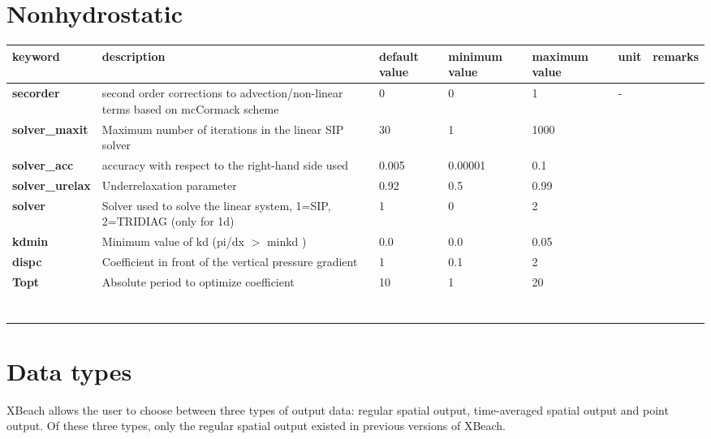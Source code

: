 \section{Nonhydrostatic}

\begin{tabular}{|p{0.7in}|p{0.9in}|p{0.4in}|p{0.5in}|p{0.5in}|p{0.3in}|p{0.5in}|} \hline 
keyword\textbf{} & description & default value & minimum value & maximum value & unit & remarks \\ \hline 
\textbf{secorder} & second order corrections to advection/non-linear terms based on mcCormack scheme & 0 & 0 & 1 & - &  \\ \hline 
\textbf{solver\_maxit} & Maximum number of iterations in the linear SIP solver & 30 & 1 & 1000 &  &  \\ \hline 
\textbf{solver\_acc} & accuracy with respect to the right-hand side used & 0.005 & 0.00001 & 0.1 &  &  \\ \hline 
\textbf{solver\_urelax} & Underrelaxation parameter & 0.92 & 0.5 & 0.99 &  &  \\ \hline 
\textbf{solver} & Solver used to solve the linear system, 1=SIP, 2=TRIDIAG (only for 1d) & 1 & 0 & 2 &  &  \\ \hline 
\textbf{kdmin} & Minimum value of kd (pi/dx $>$ minkd ) & 0.0 & 0.0 & 0.05 &  &  \\ \hline 
\textbf{dispc} & Coefficient in front of the vertical pressure gradient & 1 & 0.1 & 2 &  &  \\ \hline 
\textbf{Topt} & Absolute period to optimize coefficient & 10 & 1 & 20 &  &  \\ \hline 
\textbf{} &  &  &  &  &  &  \\ \hline 
\textbf{} &  &  &  &  &  &  \\ \hline 
\textbf{} &  &  &  &  &  &  \\ \hline 
\textbf{} &  &  &  &  &  &  \\ \hline 
\textbf{} &  &  &  &  &  &  \\ \hline 
\textbf{} &  &  &  &  &  &  \\ \hline 
\textbf{} &  &  &  &  &  &  \\ \hline 
\end{tabular}
\section{Data types}

XBeach allows the user to choose between three types of output data: regular spatial output, time-averaged spatial output and point output. Of these three types, only the regular spatial output existed in previous versions of XBeach.


